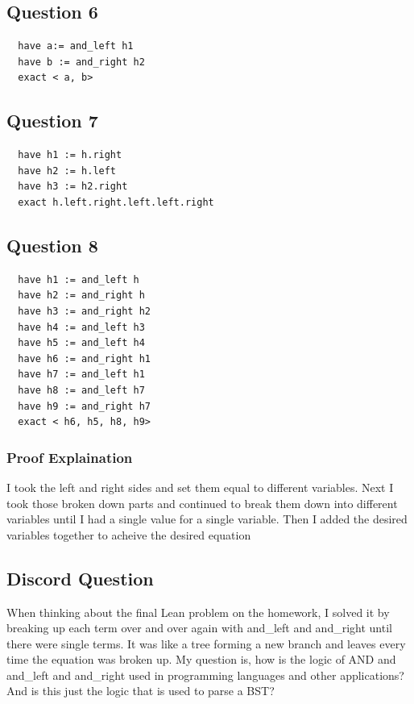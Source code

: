 \documentclass{article}
\theoremstyle{plain}
\theoremstyle{definition}
\theoremstyle{remark}
\begin{document}
\subsection{Question 6}

\begin{lstlisting}
  have a:= and_left h1
  have b := and_right h2
  exact < a, b>
\end{lstlisting}

\subsection{Question 7}

\begin{lstlisting}
  have h1 := h.right
  have h2 := h.left
  have h3 := h2.right
  exact h.left.right.left.left.right
\end{lstlisting}

\subsection{Question 8}

\begin{lstlisting}
  have h1 := and_left h
  have h2 := and_right h
  have h3 := and_right h2
  have h4 := and_left h3
  have h5 := and_left h4
  have h6 := and_right h1
  have h7 := and_left h1
  have h8 := and_left h7
  have h9 := and_right h7
  exact < h6, h5, h8, h9>
\end{lstlisting}

\subsubsection{Proof Explaination}
I took the left and right sides and set them equal to different variables. Next I took those broken down parts and continued to break them down into different variables until I had a single value for a single variable. Then I added the desired variables together to acheive the desired equation

\subsection{Discord Question}
When thinking about the final Lean problem on the homework, I solved it by breaking up each term over and over again with and\_left and and\_right until there were single terms. It was like a tree forming a new branch and leaves every time the equation was broken up. My question is, how is the logic of AND and and\_left and and\_right used in programming languages and other applications? And is this just the logic that is used to parse a BST?	
\end{document}
